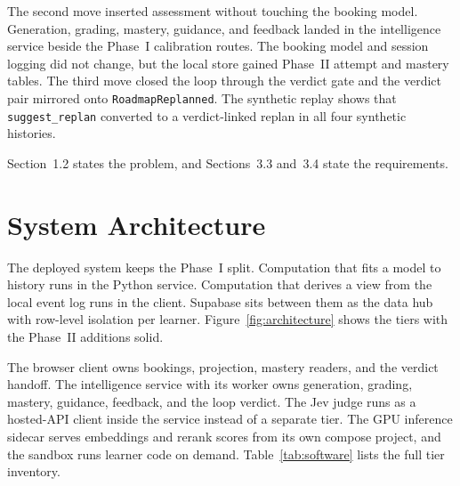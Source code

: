 The second move inserted assessment without touching the booking model. Generation, grading, mastery, guidance, and feedback landed in the intelligence service beside the Phase~I calibration routes. The booking model and session logging did not change, but the local store gained Phase~II attempt and mastery tables. The third move closed the loop through the verdict gate and the verdict pair mirrored onto \texttt{RoadmapReplanned}. The synthetic replay shows that \texttt{suggest\_replan} converted to a verdict-linked replan in all four synthetic histories.

Section~1.2 states the problem, and Sections~3.3 and~3.4 state the requirements.

\section{System Architecture}
The deployed system keeps the Phase~I split. Computation that fits a model to history runs in the Python service. Computation that derives a view from the local event log runs in the client. Supabase sits between them as the data hub with row-level isolation per learner. Figure~\ref{fig:architecture} shows the tiers with the Phase~II additions solid.

The browser client owns bookings, projection, mastery readers, and the verdict handoff. The intelligence service with its worker owns generation, grading, mastery, guidance, feedback, and the loop verdict. The Jev judge runs as a hosted-API client inside the service instead of a separate tier. The GPU inference sidecar serves embeddings and rerank scores from its own compose project, and the sandbox runs learner code on demand. Table~\ref{tab:software} lists the full tier inventory.

